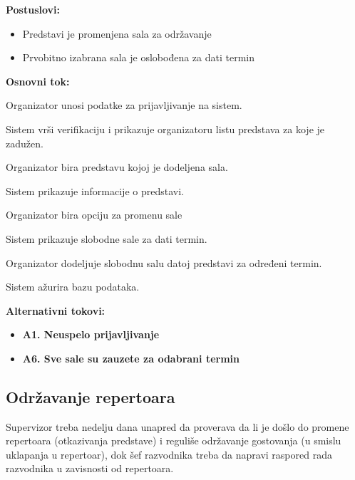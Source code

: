 \documentclass[a4paper]{article}
\begin{document}
\noindent\textbf{Postuslovi:} 
  \begin{itemize}
    \item Predstavi je promenjena  sala za održavanje
    \item Prvobitno izabrana sala je oslobođena za dati termin
  \end{itemize}

\noindent\textbf{Osnovni tok:}
  \begin{legal}
  \item Organizator unosi podatke za prijavljivanje na sistem.
    \item Sistem vrši verifikaciju i prikazuje organizatoru listu predstava za koje je zadužen.
    \item Organizator bira predstavu kojoj je dodeljena sala.
    \item Sistem prikazuje informacije o predstavi.
    \item Organizator bira opciju za promenu sale
    \item Sistem prikazuje slobodne sale za dati termin.
    \item Organizator dodeljuje slobodnu salu datoj predstavi za određeni termin.
     \item Sistem ažurira bazu podataka.
  \end{legal}

\noindent\textbf{Alternativni tokovi:} 
\begin{itemize}
 \item \textbf{A1. Neuspelo prijavljivanje} 
       \item \textbf{A6. Sve sale su zauzete za odabrani termin} 
\end{itemize}


\newpage
\subsection{Održavanje repertoara}
  Supervizor treba nedelju dana unapred da proverava da li je došlo do promene repertoara (otkazivanja predstave) i reguliše održavanje gostovanja (u smislu uklapanja u repertoar), dok šef razvodnika treba da napravi raspored rada razvodnika u zavisnosti od repertoara. 
  
\end{document}
